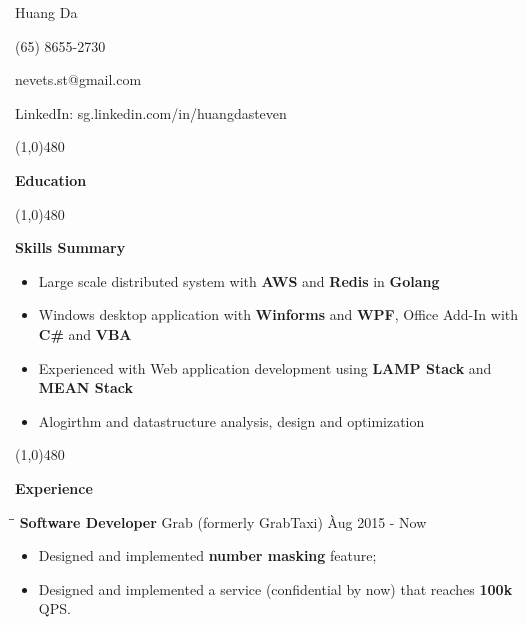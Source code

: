 \documentclass{article}
\begin{document}
\centerline{{\Huge \sc Huang Da} }
\centerline{(65) 8655-2730}
\centerline{nevets.st@gmail.com}
\centerline{LinkedIn: sg.linkedin.com/in/huangdasteven}

\noindent

\centerline{\line(1,0){480}}

\medskip

\centerline {\Large \bf Education}

\smallskip


\centerline{\line(1,0){480}}

\medskip

\centerline {\Large \bf {Skills Summary}}

\vspace{-6pt}\smallskip

\begin{itemize}[leftmargin=*]
  \item Large scale distributed system with {\bf AWS} and {\bf Redis} in {\bf Golang} \vspace{-6pt}
  \item Windows desktop application with {\bf Winforms} and {\bf WPF}, Office Add-In with {\bf C\#}  and {\bf VBA}\vspace{-6pt}
  \item Experienced with Web application development using {\bf LAMP Stack} and {\bf MEAN Stack} \vspace{-6pt}
  \item Alogirthm and datastructure analysis, design and optimization \vspace{-6pt}
\end{itemize}

\centerline{\line(1,0){480}}

\medskip

\centerline {\Large \bf Experience}

\medskip


\begin{tabbing}
\hspace{2.6in}\= \hspace{2.6in}\= \kill
{\bf Software Developer} \> Grab (formerly GrabTaxi) \`Aug 2015 - Now\
\end{tabbing}

\begin{itemize}
    \item Designed and implemented {\bf number masking} feature; \vspace{-6pt}
    \item Designed and implemented a service (confidential by now) that reaches {\bf 100k} QPS. \vspace{-6pt}
\end{itemize}
\end{document}
